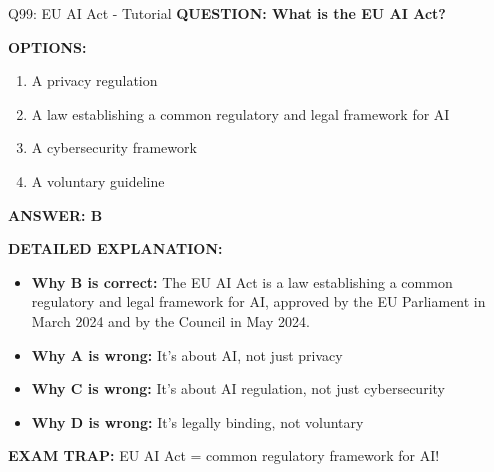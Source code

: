 \documentclass[8pt]{beamer}
\begin{document}
	\begin{frame}{Q99: EU AI Act - Tutorial}
		\fontsize{6.5}{7.5}\selectfont
		\textbf{QUESTION: What is the EU AI Act?}
		
		\vspace{0.1cm}
		\textbf{OPTIONS:}
		\begin{enumerate}
			\item A privacy regulation
			\item A law establishing a common regulatory and legal framework for AI
			\item A cybersecurity framework
			\item A voluntary guideline
		\end{enumerate}
		
		\vspace{0.1cm}
		\textcolor{myblue}{\textbf{ANSWER: B}}
		
		\vspace{0.1cm}
		\textbf{DETAILED EXPLANATION:}
		\begin{itemize}
			\item \textbf{Why B is correct:} The EU AI Act is a law establishing a common regulatory and legal framework for AI, approved by the EU Parliament in March 2024 and by the Council in May 2024.
			\item \textbf{Why A is wrong:} It's about AI, not just privacy
			\item \textbf{Why C is wrong:} It's about AI regulation, not just cybersecurity
			\item \textbf{Why D is wrong:} It's legally binding, not voluntary
		\end{itemize}
		
		\textcolor{myred}{\textbf{EXAM TRAP:}} EU AI Act = \textcolor{myblue}{common regulatory framework for AI}!
	\end{frame}
	
\end{document}
